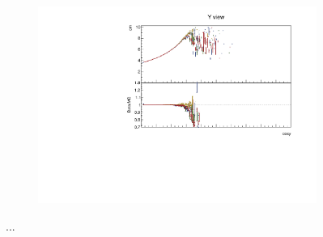 \documentclass[12pt,a4paper]{article}
\begin{document}
\begin{figure}[h!]
\begin{subfigure}{0.5\textwidth}
  \end{subfigure}
  \begin{subfigure}{0.5\textwidth}
    \includegraphics[width=\linewidth]{PlotsAngularDistribution/cm_cosy_y.pdf}
  \end{subfigure}
  \caption{...}
  \label{figAbsCalibCosY2}
\end{figure}
\end{document}
